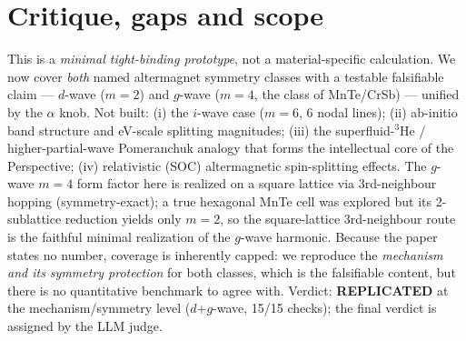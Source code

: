 \documentclass[11pt]{article}
\begin{document}
\section{Critique, gaps and scope}
This is a \emph{minimal tight-binding prototype}, not a material-specific calculation. We now cover
\emph{both} named altermagnet symmetry classes with a testable falsifiable claim --- $d$-wave
($m{=}2$) and $g$-wave ($m{=}4$, the class of MnTe/CrSb) --- unified by the $\alpha$ knob. Not built:
(i) the $i$-wave case ($m{=}6$, 6 nodal lines); (ii) ab-initio band structure and eV-scale
splitting magnitudes; (iii) the superfluid-$^3$He / higher-partial-wave Pomeranchuk analogy that
forms the intellectual core of the Perspective; (iv) relativistic (SOC) altermagnetic
spin-splitting effects. The $g$-wave $m{=}4$ form factor here is realized on a square lattice via
3rd-neighbour hopping (symmetry-exact); a true hexagonal MnTe cell was explored but its
2-sublattice reduction yields only $m{=}2$, so the square-lattice 3rd-neighbour route is the
faithful minimal realization of the $g$-wave harmonic. Because the paper states no number,
coverage is inherently capped: we reproduce the \emph{mechanism and its symmetry protection} for
both classes, which is the falsifiable content, but there is no quantitative benchmark to agree
with. Verdict: \textbf{REPLICATED} at the mechanism/symmetry level ($d$+$g$-wave, 15/15 checks);
the final verdict is assigned by the LLM judge.
\end{document}
